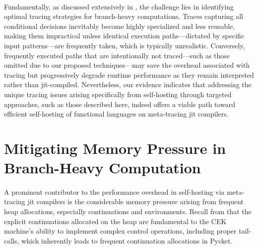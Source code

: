     \paragraph{}%
      Fundamentally, as discussed extensively in , the challenge lies in identifying optimal tracing strategies for branch-heavy computations. Traces capturing all conditional decisions inevitably become highly specialized and less reusable, making them impractical unless identical execution paths—dictated by specific input patterns—are frequently taken, which is typically unrealistic. Conversely, frequently executed paths that are intentionally not traced—such as those omitted due to our proposed techniques—may save the overhead associated with tracing but progressively degrade runtime performance as they remain interpreted rather than \gls{jit}-compiled. Nevertheless, our evidence indicates that addressing the unique tracing issues arising specifically from self-hosting through targeted approaches, such as those described here, indeed offers a viable path toward efficient self-hosting of functional languages on meta-tracing \gls{jit} compilers.

	\section[\texorpdfstring{Mitigating Memory Pressure in Branch-Heavy Computation}{CEK + Stackful Model}]{Mitigating Memory Pressure in Branch-Heavy Computation}
    \label{section:stackful}

    \paragraph{}%
      A prominent contributor to the performance overhead in self-hosting via meta-tracing \gls{jit} compilers is the considerable memory pressure arising from frequent heap allocations, especially continuations and environments. Recall from  that the explicit continuations allocated on the heap are fundamental to the CEK machine's ability to implement complex control operations, including proper tail-calls, which inherently leads to frequent continuation allocations in Pycket.

